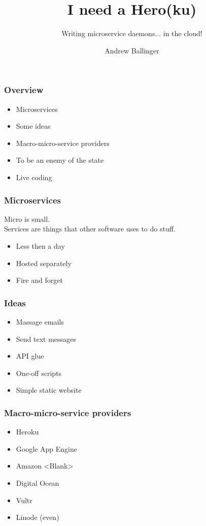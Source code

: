 \documentclass{beamer}
\title{I need a Hero(ku)}
\subtitle{ Writing microservice daemons... in the cloud!}
\author{Andrew Ballinger}
\begin{document}
\frame{\titlepage}

\begin{frame}[fragile]
  \frametitle{Overview}

  \begin{itemize}
  \item{Microservices}
  \item{Some ideas}
  \item{Macro-micro-service providers}
  \item{To be an enemy of the state}
  \item{Live coding}
  \end{itemize}

\end{frame}

\begin{frame}[fragile]
  
  \frametitle{Microservices}
  
  Micro is small. \\ Services are things that other software uses to do stuff.

  \begin{itemize}
  \item{Less then a day}
  \item{Hosted separately}
  \item{Fire and forget}
  \end{itemize}

\end{frame}

\begin{frame}[fragile]
  
  \frametitle{Ideas}

  \begin{itemize}
  \item{Massage emails}
  \item{Send text messages}
  \item{API glue}
  \item{One-off scripts} 
  \item{Simple static website} 
  \end{itemize}

\end{frame}

\begin{frame}[fragile]
  
  \frametitle{Macro-micro-service providers}

  \begin{itemize}
  \item{Heroku}
  \item{Google App Engine}
  \item{Amazon <Blank>}
  \item{Digital Ocean} 
  \item{Vultr} 
  \item{Linode (even)} 
  \end{itemize}

\end{frame}
\end{document}

